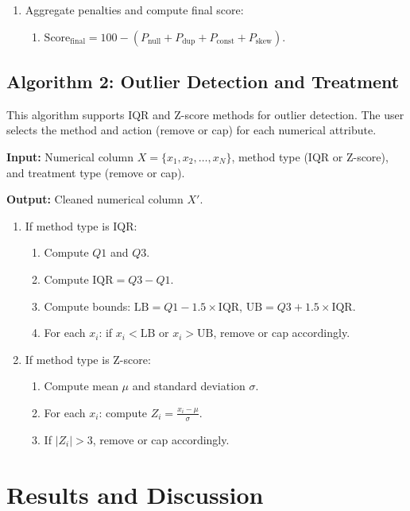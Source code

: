 \documentclass[conference]{IEEEtran}
\begin{document}
\begin{enumerate}
  \item Aggregate penalties and compute final score:
  \begin{enumerate}
    \item $\text{Score}_{\text{final}} = 100 - (P_{\text{null}} + P_{\text{dup}} + P_{\text{const}} + P_{\text{skew}})$.
  \end{enumerate}
\end{enumerate}

\subsection{Algorithm 2: Outlier Detection and Treatment}

This algorithm supports IQR and Z-score methods for outlier detection. The user selects the method and action (remove or cap) for each numerical attribute.

\textbf{Input:} Numerical column $X = \{x_1, x_2, \ldots, x_N\}$, method type (IQR or Z-score), and treatment type (remove or cap).

\textbf{Output:} Cleaned numerical column $X'$.

\begin{enumerate}
  \item If method type is IQR:
  \begin{enumerate}
    \item Compute $Q1$ and $Q3$.
    \item Compute $\text{IQR} = Q3 - Q1$.
    \item Compute bounds: $\text{LB} = Q1 - 1.5 \times \text{IQR}$, $\text{UB} = Q3 + 1.5 \times \text{IQR}$.
    \item For each $x_i$: if $x_i < \text{LB}$ or $x_i > \text{UB}$, remove or cap accordingly.
  \end{enumerate}

  \item If method type is Z-score:
  \begin{enumerate}
    \item Compute mean $\mu$ and standard deviation $\sigma$.
    \item For each $x_i$: compute $Z_i = \frac{x_i - \mu}{\sigma}$.
    \item If $|Z_i| > 3$, remove or cap accordingly.
  \end{enumerate}
\end{enumerate}


\section{Results and Discussion}
\end{document}
